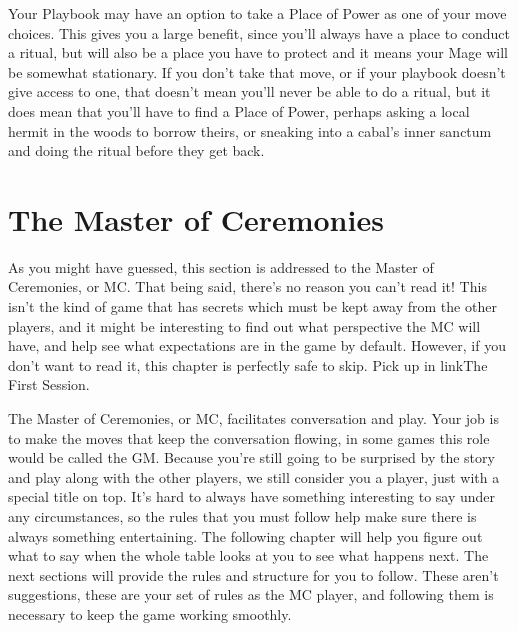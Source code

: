 \documentclass[
  oneside,
  statementpaper,
  9pt]{memoir}
\begin{document}
\begin{Player}

Your Playbook may have an option to take a Place of Power as one of your move choices. This gives you a large benefit, since you'll always have a place to conduct a ritual, but will also be a place you have to protect and it means your Mage will be somewhat stationary. If you don't take that move, or if your playbook doesn't give access to one, that doesn't mean you'll never be able to do a ritual, but it does mean that you'll have to find a Place of Power, perhaps asking a local hermit in the woods to borrow theirs, or sneaking into a cabal's inner sanctum and doing the ritual before they get back.

\end{Player}

\newpage

\hypertarget{the-master-of-ceremonies}{%
\chapter{The Master of Ceremonies}\label{the-master-of-ceremonies}}

\begin{Player}

As you might have guessed, this section is addressed to the Master of Ceremonies, or MC. That being said, there's no reason you can't read it! This isn't the kind of game that has secrets which must be kept away from the other players, and it might be interesting to find out what perspective the MC will have, and help see what expectations are in the game by default. However, if you don't want to read it, this chapter is perfectly safe to skip. Pick up in {{linkThe First Session}}.

\end{Player}

\begin{MC}

The Master of Ceremonies, or MC, facilitates conversation and play. Your job is to make the moves that keep the conversation flowing, in some games this role would be called the GM. Because you're still going to be surprised by the story and play along with the other players, we still consider you a player, just with a special title on top. It’s hard to always have something interesting to say under any circumstances, so the rules that you must follow help make sure there is always something entertaining. The following chapter will help you figure out what to say when the whole table looks at you to see what happens next. The next sections will provide the rules and structure for you to follow. These aren’t suggestions, these are your set of rules as the MC player, and following them is necessary to keep the game working smoothly.

\end{MC}
\end{document}
